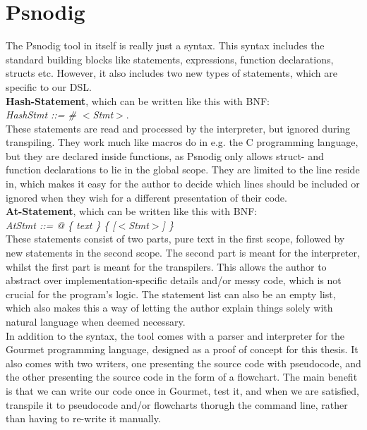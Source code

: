 \section{Psnodig}

The Psnodig tool in itself is really just a syntax. This syntax includes the standard building blocks like statements, expressions, function declarations, structs etc. However, it also includes two new types of statements, which are specific to our DSL. \hfill \\

\textbf{Hash-Statement}, which can be written like this with BNF: \hfill \\

\textit{HashStmt ::= \# $<$Stmt$>$}. \hfill \\

These statements are read and processed by the interpreter, but ignored during transpiling. They work much like macros do in e.g. the C programming language, but they are declared inside functions, as Psnodig only allows struct- and function declarations to lie in the global scope. They are limited to the line reside in, which makes it easy for the author to decide which lines should be included or ignored when they wish for a different presentation of their code. \hfill \\

\textbf{At-Statement}, which can be written like this with BNF: \hfill \\

\textit{AtStmt ::= @ \{ text \} \{ [$<$Stmt$>$] \}} \hfill \\

These statements consist of two parts, pure text in the first scope, followed by new statements in the second scope. The second part is meant for the interpreter, whilst the first part is meant for the transpilers. This allows the author to abstract over implementation-specific details and/or messy code, which is not crucial for the program's logic. The statement list can also be an empty list, which also makes this a way of letting the author explain things solely with natural language when deemed necessary. \hfill \\

In addition to the syntax, the tool comes with a parser and interpreter for the Gourmet programming language, designed as a proof of concept for this thesis. It also comes with two writers, one presenting the source code with pseudocode, and the other presenting the source code in the form of a flowchart. The main benefit is that we can write our code once in Gourmet, test it, and when we are satisfied, transpile it to pseudocode and/or flowcharts thorugh the command line, rather than having to re-write it manually. \hfill \\

